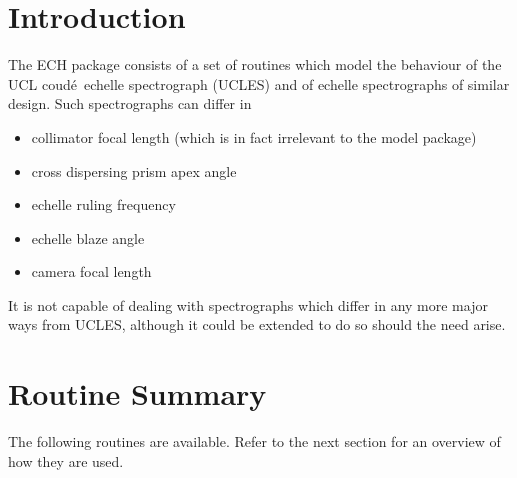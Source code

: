 \documentclass[11pt,twoside,noabs,nolof]{starlink}
\newcommand{\coude}{coud\'{e}}
\begin{document}
\scfrontmatter

\section{Introduction}

The ECH package consists of a set of routines which model the behaviour of the
UCL \coude\ echelle spectrograph (UCLES) and of echelle spectrographs of
similar design. Such spectrographs can differ in
\begin{itemize}
\item collimator focal length (which is in fact irrelevant to the model package)
\item cross dispersing prism apex angle
\item echelle ruling frequency
\item echelle blaze angle
\item camera focal length
\end{itemize}

It is not capable of dealing with spectrographs which differ in any more major
ways from UCLES, although it could be extended to do so should the need arise.

\section{Routine Summary}

The following routines are available. Refer to the next section for an overview
of how they are used.
\end{document}
